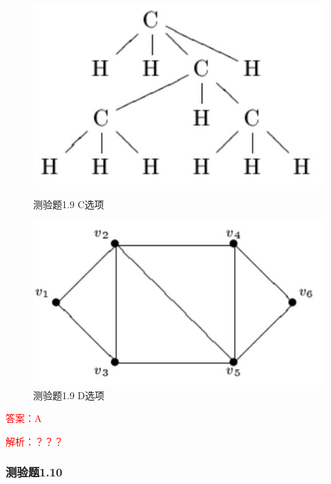 \documentclass[UTF8, heading=true]{ctexart}
\begin{document}
\begin{figure}[htbp]
  \centering
  \begin{minipage}[t]{0.35\textwidth}
      \centering
      \includegraphics[width=1\textwidth]{1.9_3.jpg} %
      \caption{测验题1.9 C选项}
  \end{minipage}
  \hfill
  \begin{minipage}[t]{0.35\textwidth}
      \centering
      \includegraphics[width=1\textwidth]{1.9_4.jpg} %
      \caption{测验题1.9 D选项}
\end{minipage}
\end{figure}

\textcolor{red}{答案：A}

\textcolor{red}{解析：？？？}

\subsubsection{测验题1.10}
\end{document}
